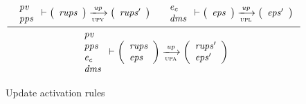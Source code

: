 \begin{figure}[htb]
  \begin{equation}
    \label{eq:rule:up-activation}
    \inference
    {
      {
        \begin{array}{l}
          \var{pv}\\
          \var{pps}
        \end{array}
      }
      \vdash
      {
        \left(
          \begin{array}{l}
            \var{rups}\\
          \end{array}
        \right)
      }
      \trans{upv}{\var{up}}
      {
        \left(
          \begin{array}{l}
            \var{rups'}\\
          \end{array}
        \right)
      }
      &
      {\begin{array}{l}
          \var{e_c}\\
          \var{dms}
        \end{array}
      }
      \vdash
      {
        \left(
          \begin{array}{l}
            \var{eps}
          \end{array}
        \right)
      }
      \trans{upl}{\var{up}}
      {
        \left(
          \begin{array}{l}
            \var{eps'}
          \end{array}
        \right)
      }
    }
    {
      {
        \begin{array}{l}
          \var{pv}\\
          \var{pps}\\
          \var{e_c}\\
          \var{dms}
        \end{array}
      }
      \vdash
      {
        \left(
          \begin{array}{l}
            \var{rups}\\
            \var{eps}
          \end{array}
        \right)
      }
      \trans{upa}{\var{up}}
      {
        \left(
          \begin{array}{l}
            \var{rups'}\\
            \var{eps'}
          \end{array}
        \right)
      }
    }
  \end{equation}
  \caption{Update activation rules}
  \label{fig:rules:up-activation}
\end{figure}

